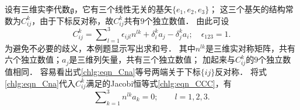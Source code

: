 设有三维实李代数$\mathfrak{g}$，它有三个线性无关的基矢$\{e_1,e_2,e_3\}$；
这三个基矢的结构常数为$C^k_{ij}$，由于下标反对称，故$C^k_{ij}$共有$9$个独立数值．
由此可设
\begin{equation}\label{chlg:eqn_Cna}
	C^k_{ij} = \sum\nolimits_{l=1}^{3}\epsilon_{ijl} n^{lk} + \delta^k_i a_j - \delta^k_j a_i ; 
	\quad \epsilon_{123} =1.	
\end{equation}
为避免不必要的歧义，本例题显示写出求和号．
其中$n^{lk}$是三维实对称矩阵，共有六个独立数值；$a_j$是三维列矢量，共有三个独立数值；
加起来与$C^k_{ij}$的$9$个独立数值相同．
容易看出式\eqref{chlg:eqn_Cna}等号两端关于下标$\{ij\}$反对称．
将式\eqref{chlg:eqn_Cna}代入$C^k_{ij}$满足的Jacobi恒等式\eqref{chlg:eqn_CCC}，有
\begin{equation}\label{chlg:eqn_Jacobi-na}
	\sum\nolimits_{k=1}^{3}n^{lk} a_k =0;\qquad l=1,2,3.
\end{equation}
